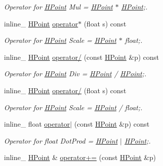 \begin{DoxyCompactItemize}
\begin{DoxyCompactList}\small\item\em Operator for \hyperlink{classHPoint}{H\+Point} Mul = \hyperlink{classHPoint}{H\+Point} $\ast$ \hyperlink{classHPoint}{H\+Point};. \end{DoxyCompactList}\item 
inline\+\_\+ \hyperlink{classHPoint}{H\+Point} \hyperlink{classHPoint_a03246f811237b5e1a65fc306495140cd}{operator$\ast$} (float s) const \hypertarget{classHPoint_a03246f811237b5e1a65fc306495140cd}{}\label{classHPoint_a03246f811237b5e1a65fc306495140cd}

\begin{DoxyCompactList}\small\item\em Operator for \hyperlink{classHPoint}{H\+Point} Scale = \hyperlink{classHPoint}{H\+Point} $\ast$ float;. \end{DoxyCompactList}\item 
inline\+\_\+ \hyperlink{classHPoint}{H\+Point} \hyperlink{classHPoint_ae8f7600571fcc3b22eca98339163fbd6}{operator/} (const \hyperlink{classHPoint}{H\+Point} \&p) const \hypertarget{classHPoint_ae8f7600571fcc3b22eca98339163fbd6}{}\label{classHPoint_ae8f7600571fcc3b22eca98339163fbd6}

\begin{DoxyCompactList}\small\item\em Operator for \hyperlink{classHPoint}{H\+Point} Div = \hyperlink{classHPoint}{H\+Point} / \hyperlink{classHPoint}{H\+Point};. \end{DoxyCompactList}\item 
inline\+\_\+ \hyperlink{classHPoint}{H\+Point} \hyperlink{classHPoint_a3dbf22e6d49a939c8ab717766fa73f26}{operator/} (float s) const \hypertarget{classHPoint_a3dbf22e6d49a939c8ab717766fa73f26}{}\label{classHPoint_a3dbf22e6d49a939c8ab717766fa73f26}

\begin{DoxyCompactList}\small\item\em Operator for \hyperlink{classHPoint}{H\+Point} Scale = \hyperlink{classHPoint}{H\+Point} / float;. \end{DoxyCompactList}\item 
inline\+\_\+ float \hyperlink{classHPoint_a0303ae2cc164fd8ee05920637af64ad0}{operator$\vert$} (const \hyperlink{classHPoint}{H\+Point} \&p) const \hypertarget{classHPoint_a0303ae2cc164fd8ee05920637af64ad0}{}\label{classHPoint_a0303ae2cc164fd8ee05920637af64ad0}

\begin{DoxyCompactList}\small\item\em Operator for float Dot\+Prod = \hyperlink{classHPoint}{H\+Point} $\vert$ \hyperlink{classHPoint}{H\+Point};. \end{DoxyCompactList}\item 
inline\+\_\+ \hyperlink{classHPoint}{H\+Point} \& \hyperlink{classHPoint_a790342c8074c1a8bc3e322b83ea363b1}{operator+=} (const \hyperlink{classHPoint}{H\+Point} \&p)\hypertarget{classHPoint_a790342c8074c1a8bc3e322b83ea363b1}{}\label{classHPoint_a790342c8074c1a8bc3e322b83ea363b1}


\end{DoxyCompactItemize}
